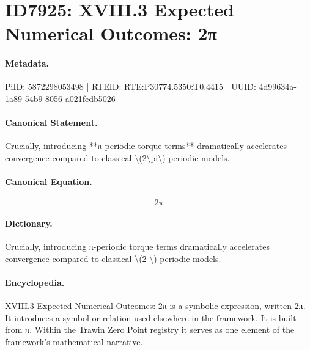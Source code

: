 \section*{ID7925: XVIII.3 Expected Numerical Outcomes: 2π}
\paragraph{Metadata.}
PiID: 5872298053498 | RTEID: RTE:P30774.5350:T0.4415 | UUID: 4d99634a-1a89-54b9-8056-a021fedb5026

\paragraph{Canonical Statement.}
Crucially, introducing **π-periodic torque terms** dramatically accelerates convergence compared to classical \textbackslash{}(2\textbackslash{}pi\textbackslash{})-periodic models.

\paragraph{Canonical Equation.}
\[
2\pi
\]

\paragraph{Dictionary.}
Crucially, introducing π-periodic torque terms dramatically accelerates convergence compared to classical \textbackslash{}(2 \textbackslash{})-periodic models.

\paragraph{Encyclopedia.}
XVIII.3 Expected Numerical Outcomes: 2π is a symbolic expression, written 2π. It introduces a symbol or relation used elsewhere in the framework. It is built from π. Within the Trawin Zero Point registry it serves as one element of the framework's mathematical narrative.
